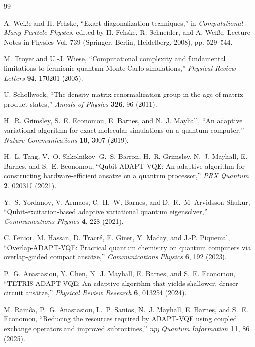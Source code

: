 \documentclass[
  reprint,
  amsmath,
  amssymb,
  aps,
  pra,
  nofootinbib,
  superscriptaddress,
  floatfix
]{revtex4-2}
\begin{document}
\begin{thebibliography}{99}

A. Wei{\ss}e and H. Fehske,
``Exact diagonalization techniques,''
in \emph{Computational Many-Particle Physics},
edited by H. Fehske, R. Schneider, and A. Wei{\ss}e,
Lecture Notes in Physics Vol. 739 (Springer, Berlin, Heidelberg, 2008), pp. 529--544.

M. Troyer and U.-J. Wiese,
``Computational complexity and fundamental limitations to fermionic quantum Monte Carlo simulations,''
\emph{Physical Review Letters} \textbf{94}, 170201 (2005).

U. Schollw\"ock,
``The density-matrix renormalization group in the age of matrix product states,''
\emph{Annals of Physics} \textbf{326}, 96 (2011).

H.~R. Grimsley, S.~E. Economou, E. Barnes, and N.~J. Mayhall,
``An adaptive variational algorithm for exact molecular simulations on a quantum computer,''
\emph{Nature Communications} \textbf{10}, 3007 (2019).

H.~L. Tang, V.~O. Shkolnikov, G.~S. Barron, H.~R. Grimsley, N.~J. Mayhall, E. Barnes, and S.~E. Economou,
``Qubit-ADAPT-VQE: An adaptive algorithm for constructing hardware-efficient ans\"atze on a quantum processor,''
\emph{PRX Quantum} \textbf{2}, 020310 (2021).

Y.~S. Yordanov, V. Armaos, C.~H.~W. Barnes, and D.~R.~M. Arvidsson-Shukur,
``Qubit-excitation-based adaptive variational quantum eigensolver,''
\emph{Communications Physics} \textbf{4}, 228 (2021).

C. Feniou, M. Hassan, D. Traor\'e, E. Giner, Y. Maday, and J.-P. Piquemal,
``Overlap-ADAPT-VQE: Practical quantum chemistry on quantum computers via overlap-guided compact ans\"atze,''
\emph{Communications Physics} \textbf{6}, 192 (2023).

P.~G. Anastasiou, Y. Chen, N.~J. Mayhall, E. Barnes, and S.~E. Economou,
``TETRIS-ADAPT-VQE: An adaptive algorithm that yields shallower, denser circuit ans\"atze,''
\emph{Physical Review Research} \textbf{6}, 013254 (2024).

M. Ram\^oa, P.~G. Anastasiou, L.~P. Santos, N.~J. Mayhall, E. Barnes, and S.~E. Economou,
``Reducing the resources required by ADAPT-VQE using coupled exchange operators and improved subroutines,''
\emph{npj Quantum Information} \textbf{11}, 86 (2025).


\end{thebibliography}
\end{document}
